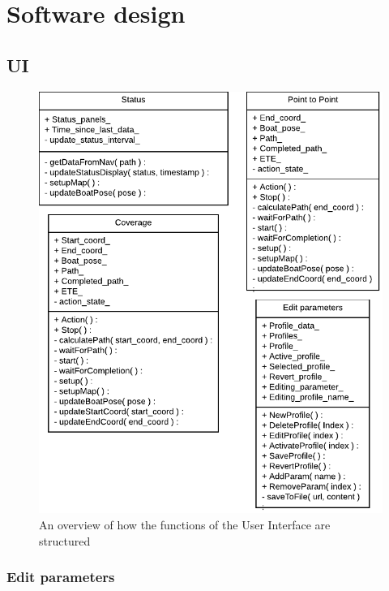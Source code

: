 \section{Software design}
\label{sec:software_design}
\subsection{UI}

\begin{figure}[H]
	\centering
	\includegraphics[width=1\linewidth]{Images/Design/User_Interface_overview}
	\caption{An overview of how the functions of the User Interface are structured}
	\label{fig:userinterfaceoverview}
\end{figure}


\subsubsection{Edit parameters}

